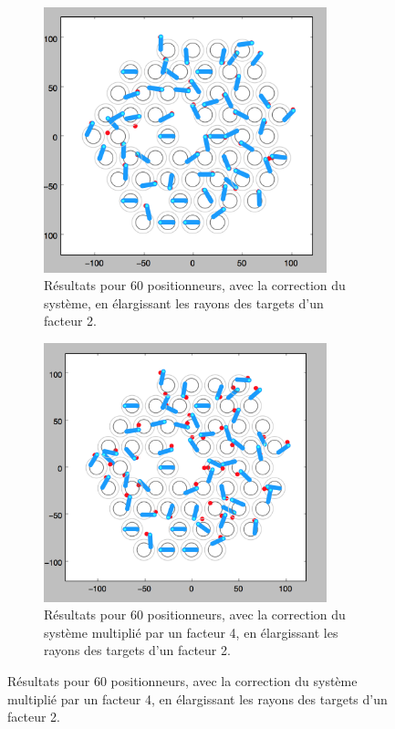 \begin{figure}[h]
\begin{center}
	\begin{subfigure}{0.49\textwidth}
		\includegraphics[width=0.9\textwidth]{set_target/correction_r2.png}
		\caption{Résultats pour 60 positionneurs, avec la correction du système, en élargissant les rayons des targets d'un facteur 2.}
		\label{fig:correction:normal}
	\end{subfigure}
	\begin{subfigure}{0.49\textwidth}
		\includegraphics[width=0.9\textwidth]{set_target/correction_x4_r2.png}
		\caption{Résultats pour 60 positionneurs, avec la correction du système multiplié par un facteur 4, en élargissant les rayons des targets d'un facteur 2.}
		\label{fig:correction:normal}
	\end{subfigure}
\end{center}
\end{figure}